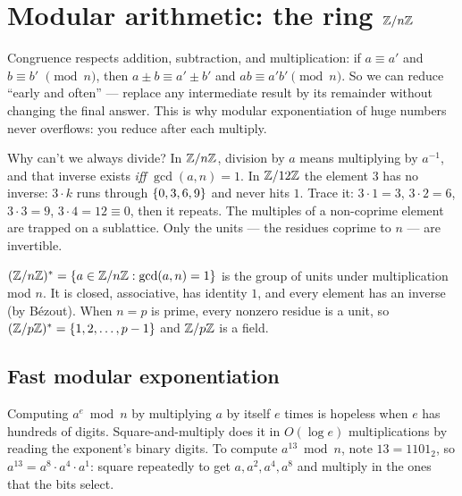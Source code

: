 \section{Modular arithmetic: the ring $\mathbb{Z}/n\mathbb{Z}$}
\label{ch40:modring}

Congruence respects addition, subtraction, and multiplication: if $a\equiv a'$ and $b\equiv b'$
$\pmod n$, then $a\pm b \equiv a'\pm b'$ and $ab\equiv a'b'\pmod n$. So we can reduce ``early and
often'' --- replace any intermediate result by its remainder without changing the final answer.
This is why modular exponentiation of huge numbers never overflows: you reduce after each multiply.

\begin{walkbox}
Why can't we always divide? In $\mathbb{Z}/n\mathbb{Z}$, division by $a$ means multiplying by $a^{-1}$, and that
inverse exists \emph{iff} $\gcd(a,n)=1$. In $\mathbb{Z}/12\mathbb{Z}$ the element $3$ has no inverse: $3\cdot k$ runs
through $\{0,3,6,9\}$ and never hits $1$. Trace it: $3\cdot 1=3$, $3\cdot 2=6$, $3\cdot 3=9$,
$3\cdot 4=12\equiv 0$, then it repeats. The multiples of a non-coprime element are trapped on a
sublattice. Only the units --- the residues coprime to $n$ --- are invertible.
\end{walkbox}

\begin{definition}[Units]
\label{ch40:def-units}
$(\mathbb{Z}/n\mathbb{Z})^{*} = \{a \in \mathbb{Z}/n\mathbb{Z} : \gcd(a,n)=1\}$ is the group of units under multiplication mod $n$. It
is closed, associative, has identity $1$, and every element has an inverse (by B\'ezout). When $n=p$
is prime, every nonzero residue is a unit, so $(\mathbb{Z}/p\mathbb{Z})^{*}=\{1,2,\dots,p-1\}$ and $\mathbb{Z}/p\mathbb{Z}$ is a field.
\end{definition}

\subsection{Fast modular exponentiation}
\label{ch40:fastexp}

Computing $a^e \bmod n$ by multiplying $a$ by itself $e$ times is hopeless when $e$ has hundreds of
digits. Square-and-multiply does it in $O(\log e)$ multiplications by reading the exponent's binary
digits. To compute $a^{13}\bmod n$, note $13 = 1101_2$, so
$a^{13} = a^{8}\cdot a^{4}\cdot a^{1}$: square repeatedly to get $a,a^2,a^4,a^8$ and multiply in the
ones that the bits select.

